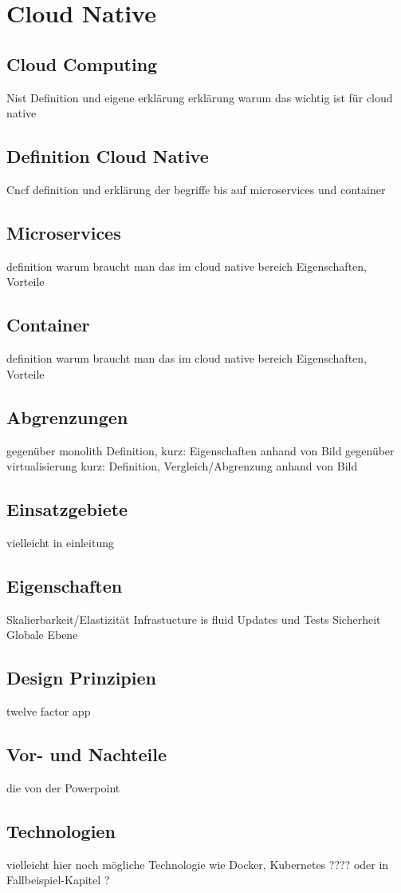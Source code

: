 \chapter{Cloud Native}

\section{Cloud Computing}
Nist Definition und eigene erklärung
erklärung warum das wichtig ist für cloud native
\section{Definition Cloud Native}
Cncf definition und erklärung der begriffe bis auf microservices und container
\section{Microservices}
definition
warum braucht man das im cloud native bereich
Eigenschaften, Vorteile
\section{Container}
definition
warum braucht man das im cloud native bereich
Eigenschaften, Vorteile
\section{Abgrenzungen}
gegenüber monolith
Definition, kurz: Eigenschaften anhand von Bild
gegenüber virtualisierung
kurz: Definition, Vergleich/Abgrenzung anhand von Bild
\section{Einsatzgebiete}
vielleicht in einleitung
\section{Eigenschaften}
Skalierbarkeit/Elastizität
Infrastucture is fluid
Updates und Tests
Sicherheit
Globale Ebene
\section{Design Prinzipien}
twelve factor app
\section{Vor- und Nachteile}
die von der Powerpoint
\section{Technologien}
vielleicht hier noch mögliche Technologie wie Docker, Kubernetes ????
oder in Fallbeispiel-Kapitel ?